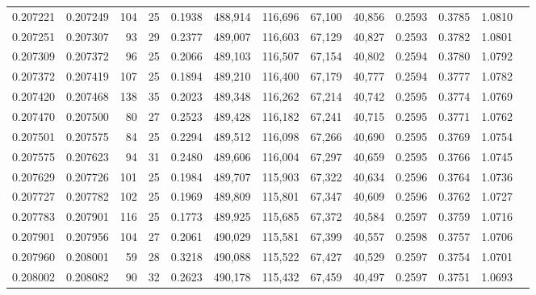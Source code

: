 \begin{tabular}{rrrrrrrrrrrrr}
0.207221 & 0.207249 & 104 &  25 &                                     0.1938 & 488,914 & 116,696 &  67,100 &  40,856 & 0.2593 & 0.3785 & 1.0810 \\
0.207251 & 0.207307 &  93 &  29 &                                     0.2377 & 489,007 & 116,603 &  67,129 &  40,827 & 0.2593 & 0.3782 & 1.0801 \\
0.207309 & 0.207372 &  96 &  25 &                                     0.2066 & 489,103 & 116,507 &  67,154 &  40,802 & 0.2594 & 0.3780 & 1.0792 \\
0.207372 & 0.207419 & 107 &  25 &                                     0.1894 & 489,210 & 116,400 &  67,179 &  40,777 & 0.2594 & 0.3777 & 1.0782 \\
0.207420 & 0.207468 & 138 &  35 &                                     0.2023 & 489,348 & 116,262 &  67,214 &  40,742 & 0.2595 & 0.3774 & 1.0769 \\
0.207470 & 0.207500 &  80 &  27 &                                     0.2523 & 489,428 & 116,182 &  67,241 &  40,715 & 0.2595 & 0.3771 & 1.0762 \\
0.207501 & 0.207575 &  84 &  25 &                                     0.2294 & 489,512 & 116,098 &  67,266 &  40,690 & 0.2595 & 0.3769 & 1.0754 \\
0.207575 & 0.207623 &  94 &  31 &                                     0.2480 & 489,606 & 116,004 &  67,297 &  40,659 & 0.2595 & 0.3766 & 1.0745 \\
0.207629 & 0.207726 & 101 &  25 &                                     0.1984 & 489,707 & 115,903 &  67,322 &  40,634 & 0.2596 & 0.3764 & 1.0736 \\
0.207727 & 0.207782 & 102 &  25 &                                     0.1969 & 489,809 & 115,801 &  67,347 &  40,609 & 0.2596 & 0.3762 & 1.0727 \\
0.207783 & 0.207901 & 116 &  25 &                                     0.1773 & 489,925 & 115,685 &  67,372 &  40,584 & 0.2597 & 0.3759 & 1.0716 \\
0.207901 & 0.207956 & 104 &  27 &                                     0.2061 & 490,029 & 115,581 &  67,399 &  40,557 & 0.2598 & 0.3757 & 1.0706 \\
0.207960 & 0.208001 &  59 &  28 &                                     0.3218 & 490,088 & 115,522 &  67,427 &  40,529 & 0.2597 & 0.3754 & 1.0701 \\
0.208002 & 0.208082 &  90 &  32 &                                     0.2623 & 490,178 & 115,432 &  67,459 &  40,497 & 0.2597 & 0.3751 & 1.0693 \\

\end{tabular}
